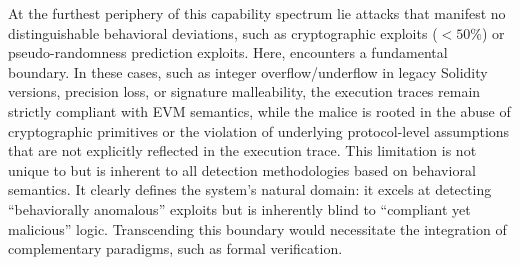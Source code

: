 At the furthest periphery of this capability spectrum lie attacks that manifest no distinguishable behavioral deviations, such as cryptographic exploits ($<50\%$) or pseudo-randomness prediction exploits. Here, \approach{} encounters a fundamental boundary. In these cases, such as integer overflow/underflow in legacy Solidity versions, precision loss, or signature malleability, the execution traces remain strictly compliant with EVM semantics, while the malice is rooted in the abuse of cryptographic primitives or the violation of underlying protocol-level assumptions that are not explicitly reflected in the execution trace. This limitation is not unique to \approach{} but is inherent to all detection methodologies based on behavioral semantics. It clearly defines the system's natural domain: it excels at detecting ``behaviorally anomalous'' exploits but is inherently blind to ``compliant yet malicious'' logic. Transcending this boundary would necessitate the integration of complementary paradigms, such as formal verification.



